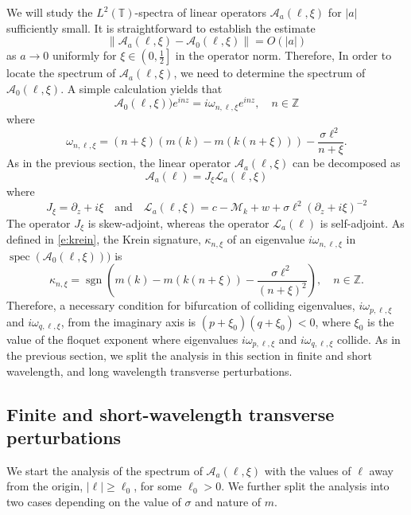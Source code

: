 \documentclass[12pt]{amsart}    %
\renewcommand{\geq}{\geqslant}
\renewcommand{\L}{\mathcal{L}}
\renewcommand{\k}{\kappa}
\newcommand{\Z}{\mathbb{Z}}
\newcommand{\calM}{\mathcal{M}}
\numberwithin{equation}{section}
\begin{document}
We will study the $L^2(\mathbb{T})$-spectra of linear operators $\mathcal A_a(\ell,\xi)$ for $|a|$ sufficiently small. It is straightforward to establish the estimate
\[
\|\mathcal A_a(\ell,\xi) - \mathcal A_0(\ell,\xi)\|= O(|a|)
\]as $a \to 0$ uniformly for $\xi\in\left(0,\frac12\right]$ in the operator norm. Therefore, In order to locate the spectrum of $\mathcal A_a(\ell,\xi)$, we need to determine the spectrum of $\mathcal A_0(\ell,\xi)$. A simple calculation yields that  
\[
\mathcal A_0(\ell,\xi)) e^{inz} = i\omega_{n,\ell,\xi}e^{inz}, \quad n\in\Z
\]
where
\[
\omega_{n, \ell, \xi} = (n+\xi)(m(k)-m(k(n+\xi)))-\frac{\sigma\ell^2}{n+\xi}.
\]
As in the previous section, the linear operator $\mathcal A_a(\ell,\xi)$ can be decomposed as
\[
\mathcal A_a(\ell) = J_\xi \L_a(\ell,\xi)
\]where
\[J_\xi = \partial_z+i\xi \quad \text{and} \quad \L_a(\ell,\xi) = c - \calM_k + w + \sigma \ell^2 (\partial_z+i\xi)^{-2}
\]
The operator $J_\xi$ is skew-adjoint, whereas the operator $\L_a(\ell)$ is self-adjoint. As defined in \eqref{e:krein}, the Krein signature, $\k_{n,\xi}$ of an eigenvalue $i\omega_{n,\ell,\xi}$ in $\operatorname{spec}(\mathcal A_0(\ell,\xi)))$ is
\begin{equation}\label{e:krsig}
\k_{n,\xi} = \operatorname{sgn}\left( m(k)-m(k(n+\xi))-\dfrac{\sigma \ell^2}{(n+\xi)^2}\right),\quad n \in \Z. 
\end{equation}
Therefore, a necessary condition for bifurcation of colliding eigenvalues, $i\omega_{p,\ell,\xi}$ and $i\omega_{q,\ell,\xi}$, from the imaginary axis is $(p+\xi_0)(q+\xi_0)< 0$, where $\xi_0$ is the value of the floquet exponent where eigenvalues $i\omega_{p,\ell,\xi}$ and $i\omega_{q,\ell,\xi}$ collide. As in the previous section, we split the analysis in this section in finite and short wavelength, and long wavelength transverse perturbations.

\subsection{Finite and short-wavelength transverse perturbations} We start the analysis of the spectrum of $\mathcal A_a(\ell,\xi)$ with the values of $\ell$ away from the origin, $|\ell|\geq \ell_0$, for some $\ell_0 > 0$. We further split the analysis into two cases depending on the value of $\sigma$ and nature of $m$. 
\end{document}
